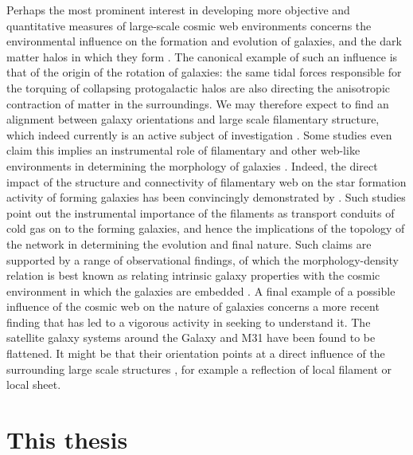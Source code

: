 Perhaps the most prominent interest in developing more objective and quantitative measures of large-scale cosmic web 
environments concerns the environmental influence on the formation and evolution of galaxies, and the dark matter 
halos in which they form \citep[see e.g.][]{Hahn2007b, Cautun2014a}. The canonical example of such 
an influence is that of the origin of the rotation of galaxies: the same tidal forces responsible for the torquing of collapsing 
protogalactic halos \citep{Hoyle1951,Peebles1969,Doroshkevich1970} are also directing the anisotropic contraction of matter in 
the surroundings. We may therefore expect to find an alignment between galaxy orientations and large scale filamentary 
structure, which indeed currently is an active subject of investigation \citep[e.g.][]{Aragon-Calvo2007,Leepen2000,Jones2010,Codis2012,
tempel2013,Trowland2013,Hirv2017}. Some studies even claim this implies an instrumental 
role of filamentary and other web-like environments in determining 
the morphology of galaxies \citep[see e.g.][for a short review]{Pichon2016}. Indeed, the direct impact of the structure and 
connectivity of filamentary web on the star formation activity of forming galaxies has been convincingly demonstrated 
by \citet[][see also \citealt{2015MNRAS.449.2087D,2015MNRAS.454..637G,Aragon-Calvo2016}]{Dekel2009b}. Such studies point out the instrumental importance of the filaments as transport conduits of cold 
gas on to the forming galaxies, and hence the implications of the topology of the network in determining the evolution and 
final nature. Such claims are supported by a range of observational findings, of which the morphology-density relation 
\citep{Dressler1980} is best known as relating intrinsic galaxy properties with the cosmic environment in which the 
galaxies are embedded \citep[see e.g.][]{Kuutma2017}. A final example of a possible influence of the cosmic web on the nature of 
galaxies concerns a more recent finding that has led to a vigorous activity in seeking to understand it. The satellite galaxy 
systems around the Galaxy and M31 have been found to be flattened. It might be that their orientation points at a direct influence 
of the surrounding large scale structures \citep[see][]{Ibata2013,Cautun2015,Forero-Romero2014,Gonzalez2016}, for example a reflection of local filament or local sheet.


\section{This thesis}

